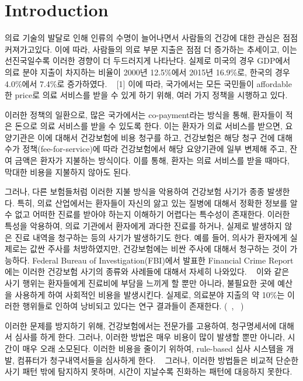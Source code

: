 \documentclass[11pt]{article}           %
\begin{document}
\section{Introduction}
\label{1}

의료 기술의 발달로 인해 인류의 수명이 늘어나면서 사람들의 건강에 대한 관심은 점점 커져가고있다.
이에 따라, 사람들의 의료 부문 지출은 점점 더 증가하는 추세이고, 이는 선진국일수록 이러한 경향이 더 두드러지게 나타난다.
실제로 미국의 경우 GDP에서 의료 분야 지출이 차지하는 비율이 2000년 12.5\%에서 2015년 16.9\%로, 한국의 경우 4.0\%에서 7.4\%로 증가하였다. ~\cite{oecd}
[1] 이에 따라, 국가에서는 모든 국민들이 affordable한 price로 의료 서비스를 받을 수 있게 하기 위해, 여러 가지 정책을 시행하고 있다.

이러한 정책의 일환으로, 많은 국가에서는 co-payment라는 방식을 통해, 환자들이 적은 돈으로 의료 서비스를 받을 수 있도록 한다.
이는 환자가 의료 서비스를 받으면, 요양기관은 이에 대해서 건강보험에 비용 청구를 하고, 건강보험은 해당 청구 건에 대해 수가 정책(fee-for-service)에 따라 건강보험에서 해당 요양기관에 일부 변제해 주고, 잔여 금액은 환자가 지불하는 방식이다.
이를 통해, 환자는 의료 서비스를 받을 때마다, 막대한 비용을 지불하지 않아도 된다. ~\cite{wang2017evaluation}

그러나, 다른 보험들처럼 이러한 지불 방식을 악용하여 건강보험 사기가 종종 발생한다.
특히, 의료 산업에서는 환자들이 자신의 앓고 있는 질병에 대해서 정확한 정보를 알 수 없고 어떠한 진료를 받아야 하는지 이해하기 어렵다는 특수성이 존재한다.
이러한 특성을 악용하여, 의료 기관에서 환자에게 과다한 진료를 하거나, 실제로 발생하지 않은 진료 내역을 청구하는 등의 사기가 발생하기도 한다.
예를 들어, 의사가 환자에게 실제로는 값싼 주사를 처방하였지만, 건강보험에는 비싼 주사에 대해서 청구하는 것이 가능하다.
Federal Bureau of Investigation(FBI)에서 발표한 Financial Crime Report에는 이러한 건강보험 사기의 종류와 사례들에 대해서 자세히 나와있다.
~\cite{fbi2012} 이와 같은 사기 행위는 환자들에게 진료비에 부담을 느끼게 할 뿐만 아니라, 불필요한 곳에 예산을 사용하게 하여 사회적인 비용을 발생시킨다.
실제로, 의료분야 지출의 약 10\%는 이러한 행위들로 인하여 낭비되고 있다는 연구 결과들이 존재한다. (~\cite{derrig2002insurance}, ~\cite{sparrow1998fraud})

이러한 문제를 방지하기 위해, 건강보험에서는 전문가를 고용하여, 청구명세서에 대해서 심사를 하게 한다.
그러나, 이러한 방법은 매우 비용이 많이 발생할 뿐만 아니라, 시간이 매우 오래 소모된다.
이러한 비용을 줄이기 위하여, rule-based 심사 시스템을 개발, 컴퓨터가 청구내역서들을 심사하게 한다. ~\cite{shan2008mining}
그러나, 이러한 방법들은 비교적 단순한 사기 패턴 밖에 탐지하지 못하며, 시간이 지날수록 진화하는 패턴에 대응하지 못한다.
\end{document}
